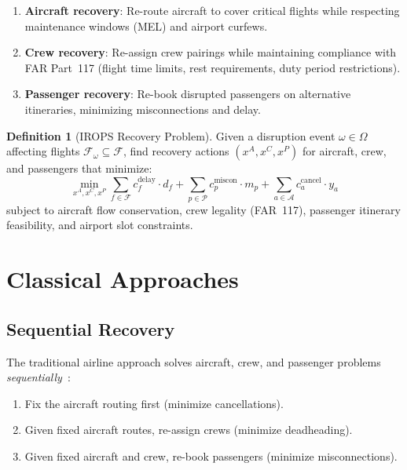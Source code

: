 \documentclass[11pt,a4paper]{book}
\theoremstyle{definition}
\newtheorem{definition}[theorem]{Definition}
\begin{document}
\begin{enumerate}
  \item \textbf{Aircraft recovery}: Re-route aircraft to cover critical flights
    while respecting maintenance windows (MEL) and airport curfews.
  \item \textbf{Crew recovery}: Re-assign crew pairings while maintaining
    compliance with FAR Part~117 (flight time limits, rest requirements,
    duty period restrictions).
  \item \textbf{Passenger recovery}: Re-book disrupted passengers on alternative
    itineraries, minimizing misconnections and delay.
\end{enumerate}

\begin{definition}[IROPS Recovery Problem]
Given a disruption event $\omega \in \Omega$ affecting flights $\mathcal{F}_\omega \subseteq \mathcal{F}$,
find recovery actions $(x^A, x^C, x^P)$ for aircraft, crew, and passengers that minimize:
\begin{equation}
  \min_{x^A, x^C, x^P} \sum_{f \in \mathcal{F}} c_f^{\text{delay}} \cdot d_f
    + \sum_{p \in \mathcal{P}} c_p^{\text{miscon}} \cdot m_p
    + \sum_{a \in \mathcal{A}} c_a^{\text{cancel}} \cdot y_a
  \label{eq:irops-obj}
\end{equation}
subject to aircraft flow conservation, crew legality (FAR~117), passenger
itinerary feasibility, and airport slot constraints.
\end{definition}

\section{Classical Approaches}

\subsection{Sequential Recovery}

The traditional airline approach solves aircraft, crew, and passenger problems
\emph{sequentially}~\cite{Lettovsky2000}:
\begin{enumerate}
  \item Fix the aircraft routing first (minimize cancellations).
  \item Given fixed aircraft routes, re-assign crews (minimize deadheading).
  \item Given fixed aircraft and crew, re-book passengers (minimize misconnections).
\end{enumerate}
\end{document}
